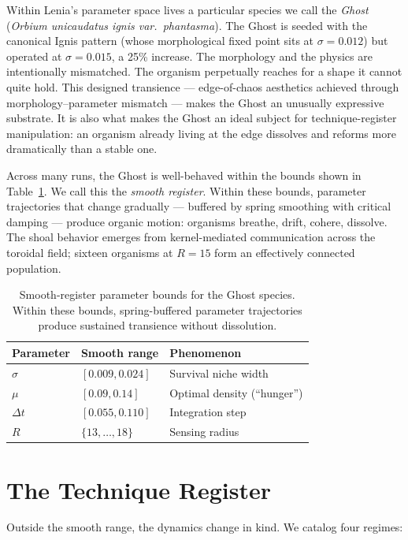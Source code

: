 \documentclass[11pt]{article}
\begin{document}
Within Lenia's parameter space lives a particular species we call the
\emph{Ghost} (\textit{Orbium unicaudatus ignis var.\ phantasma}). The Ghost
is seeded with the canonical Ignis pattern (whose morphological fixed point
sits at $\sigma = 0.012$) but operated at $\sigma = 0.015$, a 25\% increase.
The morphology and the physics are intentionally mismatched. The organism
perpetually reaches for a shape it cannot quite hold. This designed
transience --- edge-of-chaos aesthetics achieved through morphology--parameter
mismatch --- makes the Ghost an unusually expressive substrate. It is also
what makes the Ghost an ideal subject for technique-register manipulation:
an organism already living at the edge dissolves and reforms more
dramatically than a stable one.

Across many runs, the Ghost is well-behaved within the bounds shown in
Table~\ref{tab:smooth-range}. We call this the \emph{smooth register}.
Within these bounds, parameter trajectories that change gradually ---
buffered by spring smoothing with critical damping --- produce organic
motion: organisms breathe, drift, cohere, dissolve. The shoal behavior
emerges from kernel-mediated communication across the toroidal field;
sixteen organisms at $R=15$ form an effectively connected population.

\begin{table}[h]
\centering
\small
\begin{tabular}{lll}
\hline
Parameter & Smooth range & Phenomenon \\
\hline
$\sigma$ & $[0.009, 0.024]$ & Survival niche width \\
$\mu$ & $[0.09, 0.14]$ & Optimal density (``hunger'') \\
$\Delta t$ & $[0.055, 0.110]$ & Integration step \\
$R$ & $\{13,\dots,18\}$ & Sensing radius \\
\hline
\end{tabular}
\caption{Smooth-register parameter bounds for the Ghost species. Within
these bounds, spring-buffered parameter trajectories produce sustained
transience without dissolution.}
\label{tab:smooth-range}
\end{table}

\section{The Technique Register}

Outside the smooth range, the dynamics change in kind. We catalog four
regimes:
\end{document}
